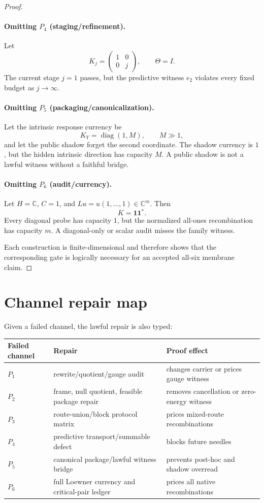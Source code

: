 \documentclass[11pt]{article}
\begin{document}
\begin{proof}
\paragraph{Omitting $P_4$ (staging/refinement).}
Let
\[
  K_j=\begin{pmatrix}1&0\\0&j\end{pmatrix},\qquad \Theta=I.
\]
The current stage $j=1$ passes, but the predictive witness $e_2$ violates every fixed budget as $j\to\infty$.

\paragraph{Omitting $P_5$ (packaging/canonicalization).}
Let the intrinsic response currency be
\[
  K_Y=\operatorname{diag}(1,M),\qquad M\gg1,
\]
and let the public shadow forget the second coordinate.  The shadow currency is $1$, but the hidden intrinsic direction has capacity $M$.  A public shadow is not a lawful witness without a faithful bridge.

\paragraph{Omitting $P_6$ (audit/currency).}
Let $H=\mathbb C$, $C=1$, and $Lu=u(1,\dots,1)\in\mathbb C^m$.  Then
\[
  K=\mathbf 1\mathbf 1^*.
\]
Every diagonal probe has capacity $1$, but the normalized all-ones recombination has capacity $m$.  A diagonal-only or scalar audit misses the family witness.

Each construction is finite-dimensional and therefore shows that the corresponding gate is logically necessary for an accepted all-six membrane claim.\end{proof}

\section{Channel repair map}
Given a failed channel, the lawful repair is also typed:
\begin{center}
\begin{tabular}{lll}
\toprule
Failed channel & Repair & Proof effect\\
\midrule
$P_1$ & rewrite/quotient/gauge audit & changes carrier or prices gauge witness\\
$P_2$ & frame, null quotient, feasible package repair & removes cancellation or zero-energy witness\\
$P_3$ & route-union/block protocol matrix & prices mixed-route recombinations\\
$P_4$ & predictive transport/summable defect & blocks future needles\\
$P_5$ & canonical package/lawful witness bridge & prevents post-hoc and shadow overread\\
$P_6$ & full Loewner currency and critical-pair ledger & prices all native recombinations\\
\bottomrule
\end{tabular}
\end{center}
\end{document}
